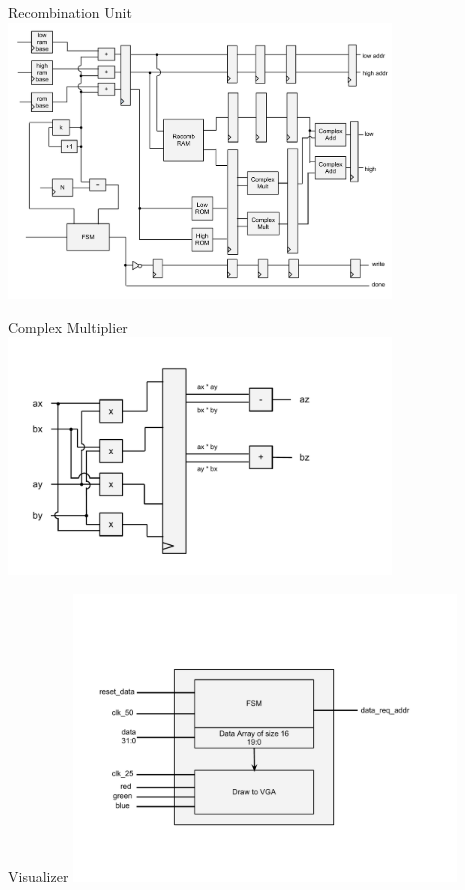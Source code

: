 \documentclass{beamer}
\begin{document}
\begin{frame}{Recombination Unit}
	\centering
	\includegraphics[width=4in]{recombinator}
\end{frame}

\begin{frame}{Complex Multiplier}
	\centering
	\includegraphics[width=4in]{complex-mult}
\end{frame}

\begin{frame}{Visualizer}
	\centering
	\includegraphics[width=4in]{viz_block_diagram}
\end{frame}
\end{document}

